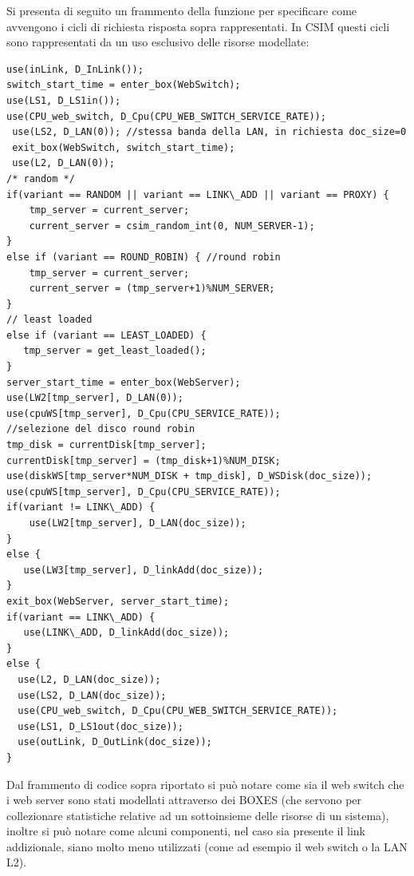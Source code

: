 Si presenta di seguito un frammento della funzione  per specificare come avvengono i cicli di richiesta risposta sopra rappresentati. In CSIM questi cicli sono rappresentati da un uso esclusivo delle risorse modellate: 
\begin{lstlisting}
use(inLink, D_InLink()); 
switch_start_time = enter_box(WebSwitch); 
use(LS1, D_LS1in()); 
use(CPU_web_switch, D_Cpu(CPU_WEB_SWITCH_SERVICE_RATE)); 
 use(LS2, D_LAN(0)); //stessa banda della LAN, in richiesta doc_size=0 
 exit_box(WebSwitch, switch_start_time); 
 use(L2, D_LAN(0)); 
/* random */ 
if(variant == RANDOM || variant == LINK\_ADD || variant == PROXY) { 
    tmp_server = current_server; 
    current_server = csim_random_int(0, NUM_SERVER-1); 
} 
else if (variant == ROUND_ROBIN) { //round robin 
    tmp_server = current_server; 
    current_server = (tmp_server+1)%NUM_SERVER; 
} 
// least loaded 
else if (variant == LEAST_LOADED) { 
   tmp_server = get_least_loaded(); 
} 
server_start_time = enter_box(WebServer); 
use(LW2[tmp_server], D_LAN(0)); 
use(cpuWS[tmp_server], D_Cpu(CPU_SERVICE_RATE)); 
//selezione del disco round robin 
tmp_disk = currentDisk[tmp_server]; 
currentDisk[tmp_server] = (tmp_disk+1)%NUM_DISK; 
use(diskWS[tmp_server*NUM_DISK + tmp_disk], D_WSDisk(doc_size)); 
use(cpuWS[tmp_server], D_Cpu(CPU_SERVICE_RATE)); 
if(variant != LINK\_ADD) { 
    use(LW2[tmp_server], D_LAN(doc_size)); 
} 
else { 
   use(LW3[tmp_server], D_linkAdd(doc_size)); 
}		 
exit_box(WebServer, server_start_time); 
if(variant == LINK\_ADD) { 
   use(LINK\_ADD, D_linkAdd(doc_size)); 
}		  
else { 
  use(L2, D_LAN(doc_size)); 
  use(LS2, D_LAN(doc_size)); 
  use(CPU_web_switch, D_Cpu(CPU_WEB_SWITCH_SERVICE_RATE)); 
  use(LS1, D_LS1out(doc_size)); 
  use(outLink, D_OutLink(doc_size)); 
}	
\end{lstlisting}
Dal frammento di codice sopra riportato si può notare come sia il web switch che i web server sono stati modellati attraverso dei BOXES (che servono per collezionare statistiche relative ad un sottoinsieme delle risorse di un sistema), inoltre si può notare come alcuni componenti, nel caso sia presente il link addizionale, siano molto meno utilizzati (come ad esempio il web switch o la LAN L2).

